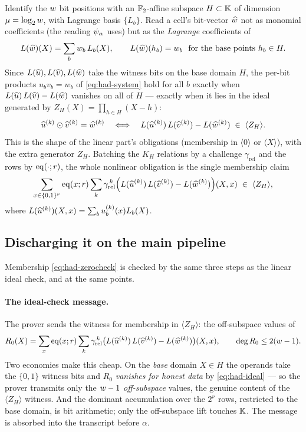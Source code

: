 Identify the $w$ bit positions with an $\mathbb{F}_2$-affine subspace $H\subset\mathbb{K}$
of dimension $\mu = \log_2w$, with Lagrange basis $\{L_b\}$. Read a cell's
bit-vector $\widehat{w}$ not as monomial coefficients (the reading $\psi_{\alpha}$ uses) but
as the \emph{Lagrange} coefficients of
\[
  L(\widehat{w})(X) = \sum_b w_b\,L_b(X),
  \qquad L(\widehat{w})(h_b) = w_b \ \text{ for the base points } h_b\in H .
\]
Since $L(\widehat{u}),L(\widehat{v}),L(\widehat{w})$ take the witness bits on the base domain
$H$, the per-bit products $u_b v_b = w_b$ of \eqref{eq:had-system} hold for all
$b$ exactly when $L(\widehat{u})\,L(\widehat{v}) - L(\widehat{w})$ vanishes on all of $H$ ---
exactly when it lies in the ideal generated by $Z_H(X) = \prod_{h\in H}(X-h)$:
\begin{equation}
  \label{eq:had-ideal}
  \widehat{u}^{(k)}\odot\widehat{v}^{(k)} = \widehat{w}^{(k)}
  \quad\Longleftrightarrow\quad
  L(\widehat{u}^{(k)})\,L(\widehat{v}^{(k)}) - L(\widehat{w}^{(k)}) \;\in\; \langle Z_H\rangle .
\end{equation}
This is the shape of the linear part's obligations (membership in $\langle 0\rangle$
or $\langle X\rangle$), with the extra generator $Z_H$. Batching the $K_H$
relations by a challenge $\gamma_{\mathrm{rel}}$ and the rows by $\operatorname{eq}(\cdot;r)$,
the whole nonlinear obligation is the single membership claim
\begin{equation}
  \label{eq:had-zerocheck}
  \sum_{x\in\{0,1\}^{\nu}} \operatorname{eq}(x;r)
  \sum_{k} \gamma_{\mathrm{rel}}^{\,k}
  \Bigl(L(\widehat{u}^{(k)})\,L(\widehat{v}^{(k)}) - L(\widehat{w}^{(k)})\Bigr)(X,x)
  \;\in\; \langle Z_H\rangle ,
\end{equation}
where $L(\widehat{u}^{(k)})(X,x) = \sum_b u^{(k)}_b(x)L_b(X)$.

\subsection{Discharging it on the main pipeline}
\label{sec:had-pipeline}

Membership \eqref{eq:had-zerocheck} is checked by the same three steps as the
linear ideal check, and at the same points.

\paragraph{The ideal-check message.} The prover sends the witness for membership
in $\langle Z_H\rangle$: the off-subspace values of
\[
  R_0(X) = \sum_{x}\operatorname{eq}(x;r)\sum_k\gamma_{\mathrm{rel}}^{\,k}
  \bigl(L(\widehat{u}^{(k)})\,L(\widehat{v}^{(k)}) - L(\widehat{w}^{(k)})\bigr)(X,x),
  \qquad \deg R_0 \le 2(w-1).
\]
Two economies make this cheap. On the \emph{base} domain $X\in H$ the operands
take the $\{0,1\}$ witness bits and $R_0$ \emph{vanishes for honest data} by
\eqref{eq:had-ideal} --- so the prover transmits only the $w-1$
\emph{off-subspace} values, the genuine content of the $\langle Z_H\rangle$
witness. And the dominant accumulation over the $2^{\nu}$ rows, restricted to the
base domain, is bit arithmetic; only the off-subspace lift touches $\mathbb{K}$. The
message is absorbed into the transcript before $\alpha$.

